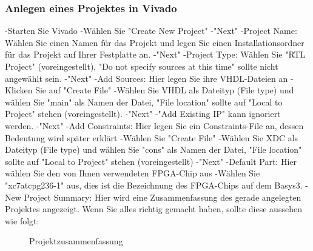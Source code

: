 \documentclass{article}
\begin{document}
\subsubsection{Anlegen eines Projektes in Vivado}
-Starten Sie Vivado\newline
-W\"ahlen Sie "Create New Project"\newline
-"Next"\newline
-Project Name: W\"ahlen Sie einen Namen für das Projekt und legen Sie einen Installationsordner für das Projekt auf Ihrer Festplatte an.\newline
-"Next"\newline
-Project Type: Wählen Sie "RTL Project" (voreingestellt), "Do not specify sources at this time" sollte nicht angewählt sein.\newline
-"Next"\newline
-Add Sources: Hier legen Sie ihre VHDL-Dateien an\newline
- Klicken Sie auf "Create File"\newline
-W\"ahlen Sie VHDL als Dateityp (File type) und w\"ahlen Sie "main" als Namen der Datei, "File location" sollte auf "Local to Project" stehen (voreingestellt).\newline
-"Next"\newline
-"Add Existing IP" kann ignoriert werden.
-"Next"\newline
-Add Constraints: Hier legen Sie ein Constraints-File an, dessen Bedeutung wird später erklärt\newline
-W\"ahlen Sie "Create File"\newline
-W\"ahlen Sie XDC als Dateityp (File type) und w\"ahlen Sie "cons" als Namen der Datei, "File location" sollte auf "Local to Project" stehen (voreingestellt)\newline
-"Next"\newline
-Default Part: Hier w\"ahlen Sie den von Ihnen verwendeten FPGA-Chip aus\newline
-Wählen Sie "xc7atcpg236-1" aus, dies ist die Bezeichnung des FPGA-Chips auf dem Basys3.\newline
-New Project Summary: Hier wird eine Zusammenfassung des gerade angelegten Projektes angezeigt. Wenn Sie alles richtig gemacht haben, sollte diese aussehen wie folgt:\newline

\begin{figure}[H]
\begin{center}
\caption{Projektzusammenfassung}
\end{center}
\end{figure}
\end{document}
